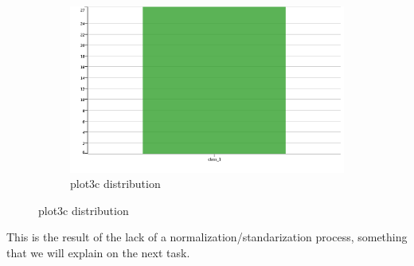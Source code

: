 \documentclass[11pt]{article}
\begin{document}
\begin{figure}[H]
\begin{subfigure}{0.4\textwidth}
			 		\includegraphics[width=\textwidth]{res/t1/t14/t14-plotc-dist}
					\caption{plot3c distribution}
					\label{fig:third}
				\end{subfigure}	
				\label{fig:figures}
			\end{figure}
			\fi
			 This is the result of the lack of a normalization/standarization process, something that we will explain on the next task.
\end{document}
